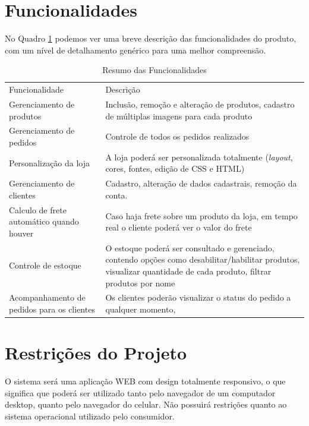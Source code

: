 \documentclass[a4paper,12pt]{monografia}
\begin{document}

\section{Funcionalidades} %
\label{sec:funcionalidades}

No Quadro \ref{quadro:funcionalidades} podemos ver uma breve descrição das funcionalidades do produto, com um nível de detalhamento genérico para uma melhor compreensão.


\begin{longtable}{|p{7cm}|p{7cm}|}
\caption{Resumo das Funcionalidades}
\label{quadro:funcionalidades}
\hline
\rowcolor{ballblue}
Funcionalidade & Descrição	\\	
Gerenciamento de produtos & Inclusão, remoção e alteração de produtos, cadastro de múltiplas imagens para cada produto
\\	
\hline
Gerenciamento de pedidos & Controle de todos os pedidos realizados
\\	
\hline
Personalização da loja & A loja poderá ser personalizada totalmente (\textit{layout}, cores, fontes, edição de CSS e HTML)
\\	
\hline
Gerenciamento de clientes & Cadastro, alteração de dados cadastrais, remoção da conta.
\\	
\hline
Calculo de frete automático quando houver & Caso haja frete sobre um produto da loja, em tempo real o cliente poderá ver o valor do frete
\\	
\hline
Controle de estoque & O estoque poderá ser consultado e gerenciado, contendo opções como desabilitar/habilitar produtos, visualizar quantidade de cada produto, filtrar produtos por nome
\\	
\hline
Acompanhamento de pedidos para os clientes & Os clientes poderão visualizar o status do pedido a qualquer momento,
\\	
\hline
\end{longtable}	



\section{Restrições do Projeto} %
\label{sec:restricoes_do_projeto}

O sistema será uma aplicação WEB com design totalmente responsivo, o que significa que poderá ser utilizado tanto pelo navegador de um computador desktop, quanto pelo navegador do celular. Não possuirá restrições quanto ao sistema operacional utilizado pelo consumidor.
\end{document}
